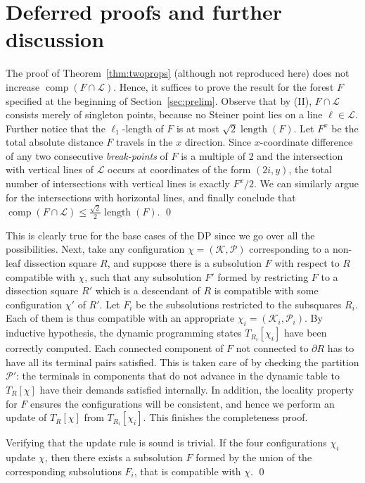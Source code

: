 \documentclass[extras,11pt]{article} \usepackage{fullpage}
\theoremstyle{mytheorem}
\newenvironment{proofof}[1]{\par\noindent{\bf #1.}\hspace{0.5em}}
    {\hfill\qed\vspace{1ex}}
\DeclareMathOperator{\len}{length}
\DeclareMathOperator{\comp}{comp}
\newcommand{\eL}{\mathcal{L}}
\begin{document}
\fi





\section{Deferred proofs and further discussion}

\begin{proofof}{\proofname\ of Lemma~\ref{lem:tot-int}}
 The proof of Theorem~\ref{thm:twoprops} (although not reproduced here) does not increase $\comp(F\cap\eL)$.
 Hence, it suffices to prove the result for the forest $F$ specified at the beginning of Section~\ref{sec:prelim}.
 Observe that by (II),  $F\cap\eL$ consists merely of singleton points,
 because no Steiner point lies on a line $\ell\in\eL$.
 Further notice that the $\ell_1$-length of $F$ is at most $\sqrt 2\len(F)$.
 Let $F^x$ be the total absolute distance $F$ travels in the $x$ direction. Since $x$-coordinate difference of any two consecutive \emph{break-points} of $F$ is a multiple of $2$ and the intersection with vertical lines of $\eL$ occurs at coordinates of the form $(2i, y)$, the total number of intersections with vertical lines is exactly $F^x/2$.
 We can similarly argue for the intersections with horizontal lines, and finally conclude that  $\comp(F\cap\eL)\leq\frac{\sqrt 2}{2}\len(F)$.
\end{proofof}


\begin{proofof}{\proofname\ of Lemma~\ref{lem:dp-sf}}
This is clearly true for the base cases of the DP since we go over all the possibilities.
Next, take any configuration $\chi=(\mathcal{K},\mathcal{P})$ corresponding to a non-leaf dissection square $R$,
and suppose there is a subsolution $F$ with respect to $R$ compatible with $\chi$,
 such that any subsolution $F'$ formed by restricting $F$ to a dissection square $R'$ which is a descendant of $R$ is compatible with some configuration $\chi'$ of $R'$.
Let $F_i$ be the subsolutions restricted to the subsquares $R_i$.
Each of them is thus compatible with an appropriate $\chi_i=(\mathcal{K}_i,\mathcal{P}_i)$.
By inductive hypothesis, the dynamic programming states $T_{R_i}[\chi_i]$ have been correctly computed.
Each connected component of $F$ not connected to $\partial R$ has to have all its terminal pairs satisfied.
This is taken care of by checking the partition $\mathcal{P}'$:
the terminals in components that do not advance in the dynamic table to $T_R[\chi]$ have their demands satisfied internally.
In addition, the locality property for $F$ ensures the configurations will be consistent,
and hence we perform an update of $T_R[\chi]$ from $T_{R_i}[\chi_i]$.
This finishes the completeness proof.

Verifying that the update rule is sound is trivial.
If the four configurations $\chi_i$ update $\chi$,
then there exists a subsolution $F$ formed by the union of the corresponding subsolutions $F_i$, that is compatible with $\chi$.
\end{proofof}
\end{document}
